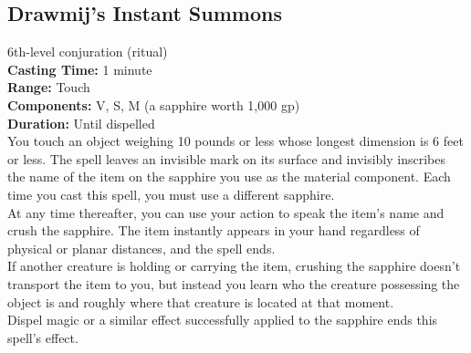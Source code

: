\documentclass[11pt, A4paper, english]{article}
\begin{document}
		\subsection{Drawmij’s Instant Summons}
6th-level conjuration (ritual) \\
\textbf{Casting Time:} 1 minute \\
\textbf{Range:} Touch \\
\textbf{Components:} V, S, M (a sapphire worth 1,000 gp) \\
\textbf{Duration:} Until dispelled \\
You touch an object weighing 10 pounds or less whose longest dimension is 6 feet or less. The spell leaves an invisible mark on its surface and invisibly inscribes the name of the item on the sapphire you use as the material component. Each time you cast this spell, you must use a different sapphire. \\
At any time thereafter, you can use your action to speak the item’s name and crush the sapphire. The item instantly appears in your hand regardless of physical or planar distances, and the spell ends. \\
If another creature is holding or carrying the item, crushing the sapphire doesn’t transport the item to you, but instead you learn who the creature possessing the object is and roughly where that creature is located at that moment. \\
Dispel magic or a similar effect successfully applied to the sapphire ends this spell’s effect.
\end{document}
